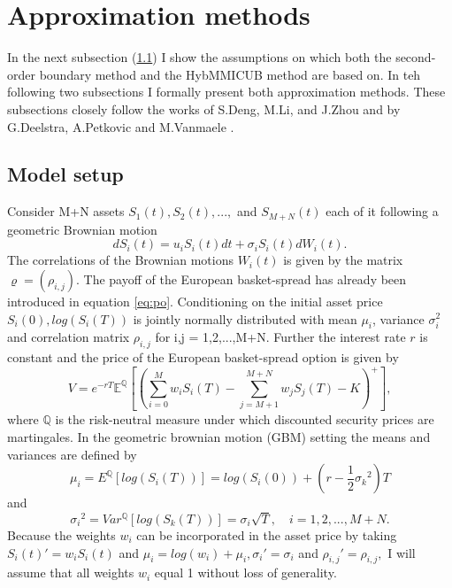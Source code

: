 \documentclass[a4paper]{article}
\begin{document}
\newpage
\section{Approximation methods}
\label{sec:am}
In the next subsection (\ref{sec:ms}) I show the assumptions on which both the second-order boundary method and the HybMMICUB method are based on. In teh following two subsections I formally present both approximation methods. These subsections closely follow the works of S.Deng, M.Li, and J.Zhou \cite{sob} and by G.Deelstra, A.Petkovic and M.Vanmaele \cite{hybmmicub}.

\subsection{Model setup}
\label{sec:ms}
Consider M+N assets $S_1(t), S_2(t), ...,$ and $S_{M+N}(t)$ each of it following a geometric Brownian motion
$$dS_i(t) = u_iS_i(t)dt + \sigma_iS_i(t)dW_i(t).$$
The correlations of the Brownian motions $W_i(t)$ is given by the matrix $\varrho=(\rho_{i,j})$. 
The payoff of the European basket-spread has already been introduced in equation \ref{eq:po}. Conditioning on the initial asset price $S_i(0), log(S_i(T))$ is jointly normally distributed with mean $\mu_i$, variance $\sigma_i^2$ and correlation matrix $\rho_{i,j}$ for i,j = 1,2,...,M+N. 
Further the interest rate $r$ is constant and the price of the European basket-spread option is given by
\begin{equation}
\label{eq:mg}
V = e^{-rT}\mathbb{E}^{\mathbb{Q}}[(\sum_{i=0}^M w_iS_i(T) - \sum_{j=M+1}^{M+N} w_jS_j(T) - K)^+],
\end{equation}
where $\mathbb{Q}$ is the risk-neutral measure under which discounted security prices are martingales.
In the geometric brownian motion (GBM) setting the means and variances are defined by 
\begin{equation}
\mu_i = E^\mathbb{Q}[log(S_i(T))] = log(S_i(0)) + (r-\frac{1}{2}{\sigma_k}^2)T
\end{equation}
and
\begin{equation}
{\sigma_i}^2 = Var^\mathbb{Q}[log(S_k(T))] = \sigma_i\sqrt{T}, \quad i=1,2,...,M+N.
\end{equation}
Because the weights $w_i$ can be incorporated in the asset price by taking $S_i(t)'=w_iS_i(t)$ and $\mu_i=log(w_i)+\mu_i, \sigma_i'=\sigma_i$ and $\rho_{i,j}'=\rho_{i,j},$ I will assume that all weights $w_i$ equal 1 without loss of generality.
\end{document}
